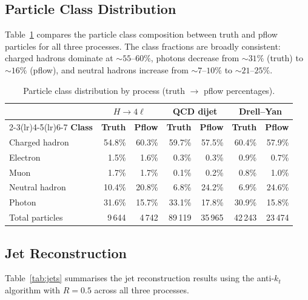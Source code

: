 \documentclass[11pt,a4paper]{article}
\begin{document}
\subsection{Particle Class Distribution}

Table~\ref{tab:classdist} compares the particle class composition between truth
and pflow particles for all three processes. The class fractions are broadly
consistent: charged hadrons dominate at ${\sim}55$--$60\%$, photons decrease
from ${\sim}31\%$ (truth) to ${\sim}16\%$ (pflow), and neutral hadrons increase
from ${\sim}7$--$10\%$ to ${\sim}21$--$25\%$.

\begin{table}[H]
\centering
\caption{Particle class distribution by process (truth $\to$ pflow percentages).}
\label{tab:classdist}
\begin{tabular}{@{}lrrrrrr@{}}
\toprule
& \multicolumn{2}{c}{\textbf{$H{\to}4\ell$}}
& \multicolumn{2}{c}{\textbf{QCD dijet}}
& \multicolumn{2}{c}{\textbf{Drell--Yan}} \\
\cmidrule(lr){2-3}\cmidrule(lr){4-5}\cmidrule(lr){6-7}
\textbf{Class} & \textbf{Truth} & \textbf{Pflow}
  & \textbf{Truth} & \textbf{Pflow}
  & \textbf{Truth} & \textbf{Pflow} \\
\midrule
Charged hadron & 54.8\% & 60.3\% & 59.7\% & 57.5\% & 60.4\% & 57.9\% \\
Electron       &  1.5\% &  1.6\% &  0.3\% &  0.3\% &  0.9\% &  0.7\% \\
Muon           &  1.7\% &  1.7\% &  0.1\% &  0.2\% &  0.8\% &  1.0\% \\
Neutral hadron & 10.4\% & 20.8\% &  6.8\% & 24.2\% &  6.9\% & 24.6\% \\
Photon         & 31.6\% & 15.7\% & 33.1\% & 17.8\% & 30.9\% & 15.8\% \\
\midrule
Total particles & 9\,644 & 4\,742 & 89\,119 & 35\,965 & 42\,243 & 23\,474 \\
\bottomrule
\end{tabular}
\end{table}

\subsection{Jet Reconstruction}

Table~\ref{tab:jets} summarises the jet reconstruction results using the
anti-$k_t$ algorithm with $R = 0.5$ across all three processes.
\end{document}
